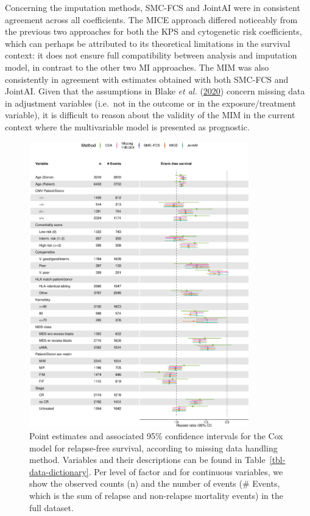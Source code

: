 \documentclass[
  letterpaper,
  DIV=11,
  numbers=noendperiod]{scrreprt}
\begin{document}
Concerning the imputation methods, SMC-FCS and JointAI were in
consistent agreement across all coefficients. The MICE approach differed
noticeably from the previous two approaches for both the KPS and
cytogenetic risk coefficients, which can perhaps be attributed to its
theoretical limitations in the survival context: it does not ensure full
compatibility between analysis and imputation model, in contrast to the
other two MI approaches. The MIM was also consistently in agreement with
estimates obtained with both SMC-FCS and JointAI. Given that the
assumptions in Blake \emph{et al.}
(\protect\hyperlink{ref-blakeEstimatingTreatmentEffects2020}{2020})
concern missing data in adjustment variables (i.e.~not in the outcome or
in the exposure/treatment variable), it is difficult to reason about the
validity of the MIM in the current context where the multivariable model
is presented as prognostic.

\begin{figure}

{\centering \includegraphics[width=0.85\textwidth,height=\textheight]{chapters/../figures/haema-review_forest-EFS.pdf}

}

\caption{\label{fig-forest-efs}Point estimates and associated 95\%
confidence intervals for the Cox model for relapse-free survival,
according to missing data handling method. Variables and their
descriptions can be found in Table~\ref{tbl-data-dictionary}. Per level
of factor and for continuous variables, we show the observed counts (n)
and the number of events (\# Events, which is the sum of relapse and
non-relapse mortality events) in the full dataset.}

\end{figure}
\end{document}

